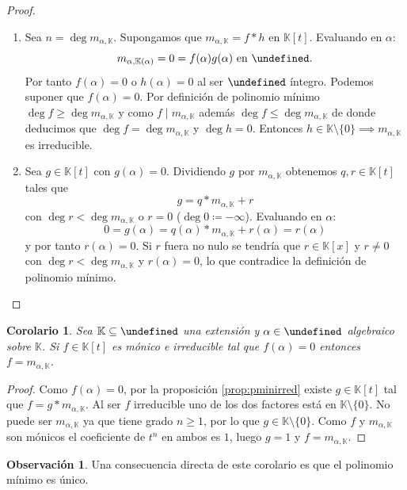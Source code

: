 \documentclass[10pt, spanish]{report}
\newtheorem{cor}{Corolario}[tma]
\theoremstyle{definition}
\newtheorem*{obs}{Observación}
\newcommand{\K}{\mathbb{K}}
\let\L\undefined
\newcommand{\L}{\mathbb{L}}
\renewcommand{\geq}{\geqslant}
\renewcommand{\leq}{\leqslant}
\begin{document}
\begin{proof}\hspace{0pt}
    \begin{enumerate}
        \item Sea $n=\deg{m_{\alpha,\K}}$. Supongamos que $m_{\alpha,\K}=f*h$ en
            $\K[t]$. Evaluando en $\alpha$:
            \[m_{\alpha,\K(\alpha)}=0=f(\alpha)g(\alpha)\text{ en }\L.\]
            Por tanto $f(\alpha)=0$ o $h(\alpha)=0$ al ser $\L$
            íntegro. Podemos suponer que $f(\alpha)=0$. Por definición de
            polinomio mínimo $\deg{f}\geq\deg{m_{\alpha,\K}}$ y como
            $f\mid m_{\alpha,\K}$ además $\deg{f}\leq \deg{m_{\alpha,\K}}$ de
            donde deducimos que $\deg{f}=\deg{m_{\alpha,\K}}$ y $\deg{h}=0$.
            Entonces $h\in\K\setminus\{0\}\implies m_{\alpha,\K}$ es
            irreducible.
        \item Sea $g\in\K[t]$ con $g(\alpha)=0$. Dividiendo $g$ por
            $m_{\alpha,\K}$ obtenemos $q,r\in\K[t]$ tales que \[g=q*m_{\alpha,
            \K}+r\] con $\deg{r}<\deg{m_{\alpha,\K}}$ o $r=0$
            ($\deg{0}\coloneqq-\infty$). Evaluando en $\alpha$:
            \[0=g(\alpha)=q(\alpha)*m_{\alpha,\K}+r(\alpha)=r(\alpha)\]
            y por tanto $r(\alpha)=0$. Si $r$ fuera no nulo se tendría que
            $r\in\K[x]$ y $r\neq 0$ con $\deg{r}<\deg{m_{\alpha,\K}}$ y
            $r(\alpha) = 0$, lo que contradice la definición de polinomio
            mínimo.
    \end{enumerate}
    \vspace{-1.75em}
\end{proof}


\begin{cor}
    Sea $\K\subseteq\L$ una extensión y $\alpha\in\L$ algebraico sobre $\K$. Si
    $f\in\K[t]$ es mónico e irreducible tal que $f(\alpha)=0$ entonces
    $f=m_{\alpha,\K}$.
\end{cor}

\begin{proof}
    Como $f(\alpha)=0$, por la proposición \ref{prop:pminirred} existe
    $g\in\K[t]$ tal que $f=g*m_{\alpha,\K}$. Al ser $f$ irreducible uno de los
    dos factores está en $\K\setminus\{0\}$.
    No puede ser $m_{\alpha,\K}$ ya que tiene grado $n\geq1$, por lo que $g\in\K
    \setminus\{0\}$. Como $f$ y $m_{\alpha,\K}$ son mónicos el coeficiente de
    $t^n$ en ambos es $1$, luego $g=1$ y $f=m_{\alpha,\K}$.
\end{proof}

\begin{obs}
    Una consecuencia directa de este corolario es que el polinomio mínimo es
    único.
\end{obs}
\end{document}
